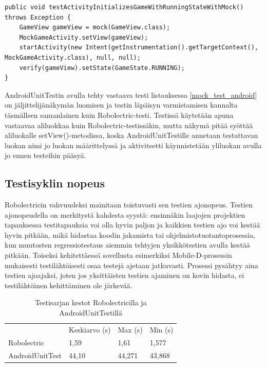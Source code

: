 \begin{lstlisting}[float,label=mock_test_android, caption=Jäljittelyä käyttävä testi AndroidUnitTestillä]
public void testActivityInitializesGameWithRunningStateWithMock() throws Exception {
	GameView gameView = mock(GameView.class);
	MockGameActivity.setView(gameView);
	startActivity(new Intent(getInstrumentation().getTargetContext(), MockGameActivity.class), null, null);
	verify(gameView).setState(GameState.RUNNING);
}
\end{lstlisting}

AndroidUnitTestin avulla tehty vastaava testi listauksessa \ref{mock_test_android} on jäljittelijänäkymän luomisen ja testin läpäisyn varmistamisen kannalta täsmälleen samanlainen kuin Robolectric-testi. Testissä käytetään apuna vastaavaa aliluokkaa kuin Robolectric-testissäkin, mutta näkymä pitää syöttää aliluokalle setView()-metodissa, koska AndroidUnitTestille annetaan testattavan luokan nimi jo luokan määrittelyssä ja aktiviteetti käynnistetään yliluokan avulla jo ennen testeihin pääsyä.

\subsection{Testisyklin nopeus}

Robolectricin vahvuudeksi mainitaan toistuvasti sen testien ajonopeus. Testien ajonopeudella on merkitystä kahdesta syystä: ensinnäkin laajojen projektien tapauksessa testitapauksia voi olla hyvin paljon ja kaikkien testien ajo voi kestää hyvin pitkään, mikä hidastaa koodin jakamista tai ohjelmistotuotantoprosessia, kun muutosten regressiotestaus aiemmin tehtyjen yksikkötestien avulla kestää pitkään. Toiseksi kehitettäessä sovellusta esimerkiksi Mobile-D-prosessin mukaisesti testilähtöisesti osaa testejä ajetaan jatkuvasti. Prosessi pysähtyy aina testien ajoajaksi, joten jos yksittäisten testien ajaminen on kovin hidasta, ei testilähtöinen kehittäminen ole järkevää.

\begin{table}[h]
\centering
\begin{tabular}{ l l l l }
   & Keskiarvo (s) & Max (s) & Min (s) \\
  Robolectric & 1,59 & 1,61 & 1,577 \\
  AndroidUnitTest & 44,10 & 44,271 & 43,868 \\
\end{tabular}
\caption{Testisarjan kestot Robolectricilla ja AndroidUnitTestillä}
\label{unittest_timing}
\end{table}

